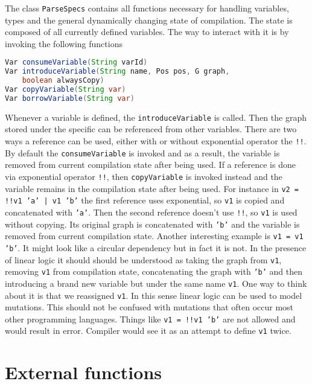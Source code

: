 \documentclass[12pt]{article}
\begin{document}
The class \texttt{ParseSpecs} contains all functions necessary for handling variables, types and the general dynamically changing state of compilation. The state is composed of all currently defined variables. The way to interact with it is by invoking the following functions
\begin{lstlisting}[language=java]
Var consumeVariable(String varId)
Var introduceVariable(String name, Pos pos, G graph, 
    boolean alwaysCopy)
Var copyVariable(String var)
Var borrowVariable(String var)
\end{lstlisting}
Whenever a variable is defined, the \texttt{introduceVariable} is called. Then the graph stored under the specific can be referenced from other variables. There are two ways a reference can be used, either with or without exponential operator the \texttt{!!}. By default the \texttt{consumeVariable} is invoked and as a result, the variable is removed from current compilation state after being used. If a reference is done via exponential operator \texttt{!!}, then  \texttt{copyVariable} is invoked instead and the variable remains in the compilation state after being used. For instance in \texttt{v2 = !!v1 'a' | v1 'b'} the first reference uses exponential, so \texttt{v1} is copied and concatenated with \texttt{'a'}. Then the second reference doesn't use \texttt{!!}, so \texttt{v1} is used without copying. Its original graph is concatenated with \texttt{'b'}  and the variable is removed from current compilation state. 
Another interesting example is \texttt{v1 = v1 'b'}. It might look like a circular dependency but in fact it is not. In the presence of linear logic it should should be understood as taking the graph from \texttt{v1}, removing \texttt{v1} from compilation state, concatenating the graph with \texttt{'b'} and then introducing a brand new variable but under the same name \texttt{v1}. One way to think about it is that we reassigned \texttt{v1}. In this sense linear logic can be used to model mutations. This should not be confused with mutations that often occur most other programming languages. Things like \texttt{v1 = !!v1 'b'} are not allowed and would result in error. Compiler would see it as an attempt to define \texttt{v1} twice.

\section{External functions}
\end{document}
